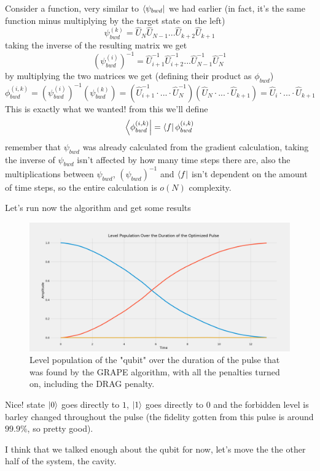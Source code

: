 Consider a function, very similar to  $\bra{\psi_{bwd}}$ we had earlier (in fact, it's the same function minus multiplying by the target state on the left)
\[
    \psi_{bwd}^{ (k)} = \hat{U}_N\hat{U}_{N-1}...\hat{U}_{k+2}\hat{U}_{k+1}
\]
taking the inverse of the resulting matrix we get
\[
    (\psi_{bwd}^{ (i)})^{-1} = \hat{U}_{i+1}^{-1}\hat{U}_{i+2}^{-1}...\hat{U}_{N-1}^{-1}\hat{U}_{N}^{-1}
\]
by multiplying the two matrices we get (defining their product as $\phi_{bwd}$)
\[
    \phi_{bwd}^{ (i,k)} = (\psi_{bwd}^{ (i)})^{-1} (\psi_{bwd}^{ (k)}) = (\hat{U}_{i+1}^{-1}\cdot...\cdot \hat{U}_{N}^{-1}) (\hat{U}_N\cdot...\cdot \hat{U}_{k+1}) = \hat{U}_{i}\cdot...\cdot \hat{U}_{k+1}
\]
This is exactly what we wanted! from this we'll define
\[
    \bra{\phi_{bwd}^{ (i,k)}} = \bra{f}\phi_{bwd}^{ (i,k)}
\]
remember that $\psi_{bwd}$ was already calculated from the gradient calculation, taking the inverse of $\psi_{bwd}$ isn't affected by how many time steps there are, also the multiplications between $\psi_{bwd}$, $ (\psi_{bwd})^{-1}$ and $\bra{f}$ isn't dependent on the amount of time steps, so the entire calculation is $o (N)$ complexity.

Let's run now the algorithm and get some results
\begin{figure}[H]
    \centering
    \includegraphics[width=1\columnwidth]{Results/DRAG/level-population2.png}
    \caption{Level population of the "qubit" over the duration of the pulse that was found by the GRAPE algorithm, with all the penalties turned on, including the DRAG penalty.}
    \label{fig:sDRAG-results}
\end{figure}
Nice! state $\ket{0}$ goes directly to $1$, $\ket{1}$ goes directly to $0$ and the forbidden level is barley changed throughout the pulse (the fidelity gotten from this pulse is around $99.9\%$, so pretty good).

I think that we talked enough about the qubit for now, let's move the the other half of the system, the cavity.


